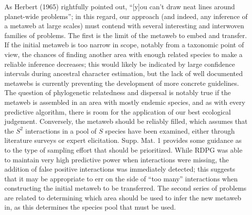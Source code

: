 \documentclass[10pt,oneside]{article}
\begin{document}
As Herbert (1965) rightfully pointed out, ``{[}y{]}ou can't draw neat
lines around planet-wide problems''; in this regard, our approach (and
indeed, any inference of a metaweb at large scales) must contend with
several interesting and interwoven families of problems. The first is
the limit of the metaweb to embed and transfer. If the initial metaweb
is too narrow in scope, notably from a taxonomic point of view, the
chances of finding another area with enough related species to make a
reliable inference decreases; this would likely be indicated by large
confidence intervals during ancestral character estimation, but the lack
of well documented metawebs is currently preventing the development of
more concrete guidelines. The question of phylogenetic relatedness and
dispersal is notably true if the metaweb is assembled in an area with
mostly endemic species, and as with every predictive algorithm, there is
room for the application of our best ecological judgement. Conversely,
the metaweb should be reliably filled, which assumes that the \(S^2\)
interactions in a pool of \(S\) species have been examined, either
through literature surveys or expert elicitation. Supp. Mat. 1 provides
some guidance as to the type of sampling effort that should be
prioritized. While RDPG was able to maintain very high predictive power
when interactions were missing, the addition of false positive
interactions was immediately detected; this suggests that it may be
appropriate to err on the side of ``too many'' interactions when
constructing the initial metaweb to be transferred. The second series of
problems are related to determining which area should be used to infer
the new metaweb in, as this determines the species pool that must be
used.
\end{document}
